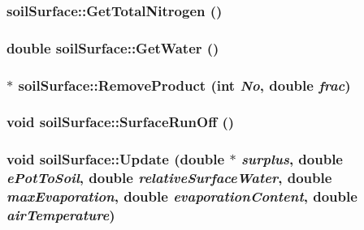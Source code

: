 \label{classsoil_surface_ad8cea52b7a9dc89b8a3999a6d79785ed}
\hypertarget{classsoil_surface_a5d93b4b66e26d8e638f67c297db44821}{
\subsubsection[{GetTotalNitrogen}]{ soilSurface::GetTotalNitrogen ()}}
\label{classsoil_surface_a5d93b4b66e26d8e638f67c297db44821}
\hypertarget{classsoil_surface_a2b80b68cebbbefb18ff4a1cbd54bbb6c}{
\subsubsection[{GetWater}]{\setlength{\rightskip}{0pt plus 5cm}double soilSurface::GetWater ()}}
\label{classsoil_surface_a2b80b68cebbbefb18ff4a1cbd54bbb6c}
\hypertarget{classsoil_surface_ab9ad1072ebafe753fdb342846877c8d7}{
\subsubsection[{RemoveProduct}]{ $\ast$ soilSurface::RemoveProduct (int {\em No}, \/  double {\em frac})}}
\label{classsoil_surface_ab9ad1072ebafe753fdb342846877c8d7}
\hypertarget{classsoil_surface_aeb5d1da5eb1d80034c7293bf4442cbbd}{
\subsubsection[{SurfaceRunOff}]{\setlength{\rightskip}{0pt plus 5cm}void soilSurface::SurfaceRunOff ()}}
\label{classsoil_surface_aeb5d1da5eb1d80034c7293bf4442cbbd}
\hypertarget{classsoil_surface_a76aba92c277390cc78e28d056f0dbbaa}{
\subsubsection[{Update}]{\setlength{\rightskip}{0pt plus 5cm}void soilSurface::Update (double $\ast$ {\em surplus}, \/  double {\em ePotToSoil}, \/  double {\em relativeSurfaceWater}, \/  double {\em maxEvaporation}, \/  double {\em evaporationContent}, \/  double {\em airTemperature})}}
\label{classsoil_surface_a76aba92c277390cc78e28d056f0dbbaa}


